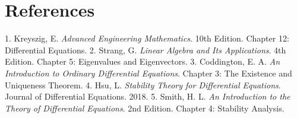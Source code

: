\documentclass[a4paper]{article}
\begin{document}
\section{References}
1. Kreyszig, E. \textit{Advanced Engineering Mathematics}. 10th Edition. Chapter 12: Differential Equations.
2. Strang, G. \textit{Linear Algebra and Its Applications}. 4th Edition. Chapter 5: Eigenvalues and Eigenvectors.
3. Coddington, E. A. \textit{An Introduction to Ordinary Differential Equations}. Chapter 3: The Existence and Uniqueness Theorem.
4. Hsu, L. \textit{Stability Theory for Differential Equations}. Journal of Differential Equations. 2018.
5. Smith, H. L. \textit{An Introduction to the Theory of Differential Equations}. 2nd Edition. Chapter 4: Stability Analysis.
\end{document}
